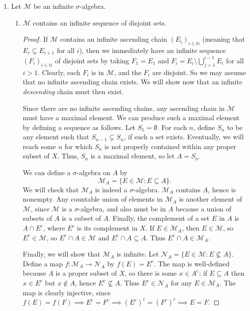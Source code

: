 \documentclass[10pt]{article}
\newcommand{\N}{\mathbb{N}}
\newcommand{\M}{\mathcal{M}}
\begin{document}

\newcommand{\NN}{\mathcal{N}}

\begin{enumerate}
\item Let $\M$ be an infinite $\sigma$-algebra.
\begin{enumerate}
\item $\M$ contains an infinite sequence of disjoint sets.

\begin{proof}
If $\M$ contains an infinite ascending chain $(E_i)_{i \in \N}$ (meaning that $E_i \subsetneq E_{i+1}$ for all $i$), then we immediately have an infinite sequence $(F_i)_{i \in \N}$ of disjoint sets by taking $F_1 = E_1$ and $F_i = E_i \setminus \bigcup_{j=1}^{i-1} E_i$ for all $i > 1$.  Clearly, each $F_i$ is in $\M$, and the $F_i$ are disjoint.  So we may assume that no infinite ascending chain exists.  We will show now that an infinite \emph{descending} chain must then exist.

Since there are no infinite ascending chains, any ascending chain in $\M$ must have a maximal element.  We can produce such a maximal element by defining a sequence as follows.  Let $S_1 = \emptyset$.  For each $n$, define $S_n$ to be any element such that $S_{n-1} \subsetneq S_n$, if such a set exists.  Eventually, we will reach some $n$ for which $S_n$ is not properly contained within any proper subset of $X$.  Thus, $S_n$ is a maximal element, so let $A = S_n$.

We can define a $\sigma$-algebra on $A$ by
$$
\M_A = \{E \in \M : E \subseteq A \}.
$$
We will check that $\M_A$ is indeed a $\sigma$-algebra.  $\M_A$ contains $A$, hence is nonempty.  Any countable union of elements in $\M_A$ is another element of $\M$, since $\M$ is a $\sigma$-algebra, and also must be in $A$ because a union of subsets of $A$ is a subset of $A$.  Finally, the complement of a set $E$ in $A$ is $A \cap E^c$, where $E^c$ is its complement in $X$.  If $E \in \M_A$, then $E \in \M$, so $E^c \in \M$, so $E^c \cap A \in \M$ and $E^c \cap A \subseteq A$.  Thus $E^c \cap A \in \M_A$.

Finally, we will show that $\M_A$ is infinite.  Let $\NN_A = \{E \in \M : E \not \subseteq A\}$.  Define a map $f : \M_A \rightarrow \NN_A$ by $f(E) = E^c$.  The map is well-defined because $A$ is a proper subset of $X$, so there is some $x \in A^c$; if $E \subseteq A$ then $x \in E^c$ but $x \not \in A$, hence $E^c \not \subseteq A$.  Thus $E^c \in \NN_A$ for any $E \in \M_A$.  The map is clearly injective, since $f(E) = f(F) \implies E^c = F^c \implies (E^c)^c = (F^c)^c \implies E = F$.


\end{proof}
\end{enumerate}
\end{enumerate}
\end{document}
